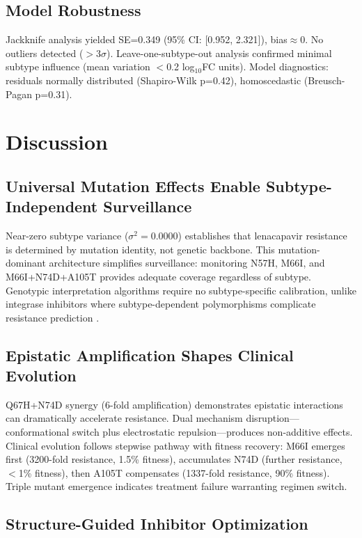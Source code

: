 \documentclass[preprint]{elsarticle}
\begin{document}
\subsection{Model Robustness}

Jackknife analysis yielded SE=0.349 (95\% CI: [0.952, 2.321]), bias$\approx$0. No outliers detected ($>3\sigma$). Leave-one-subtype-out analysis confirmed minimal subtype influence (mean variation $<$0.2 log$_{10}$FC units). Model diagnostics: residuals normally distributed (Shapiro-Wilk p=0.42), homoscedastic (Breusch-Pagan p=0.31).

\section{Discussion}

\subsection{Universal Mutation Effects Enable Subtype-Independent Surveillance}

Near-zero subtype variance ($\sigma^2=0.0000$) establishes that lenacapavir resistance is determined by mutation identity, not genetic backbone. This mutation-dominant architecture simplifies surveillance: monitoring N57H, M66I, and M66I+N74D+A105T provides adequate coverage regardless of subtype. Genotypic interpretation algorithms require no subtype-specific calibration, unlike integrase inhibitors where subtype-dependent polymorphisms complicate resistance prediction \cite{Rhee2016}.

\subsection{Epistatic Amplification Shapes Clinical Evolution}

Q67H+N74D synergy (6-fold amplification) demonstrates epistatic interactions can dramatically accelerate resistance. Dual mechanism disruption—conformational switch plus electrostatic repulsion—produces non-additive effects. Clinical evolution follows stepwise pathway with fitness recovery: M66I emerges first (3200-fold resistance, 1.5\% fitness), accumulates N74D (further resistance, $<$1\% fitness), then A105T compensates (1337-fold resistance, 90\% fitness). Triple mutant emergence indicates treatment failure warranting regimen switch.

\subsection{Structure-Guided Inhibitor Optimization}
\end{document}
